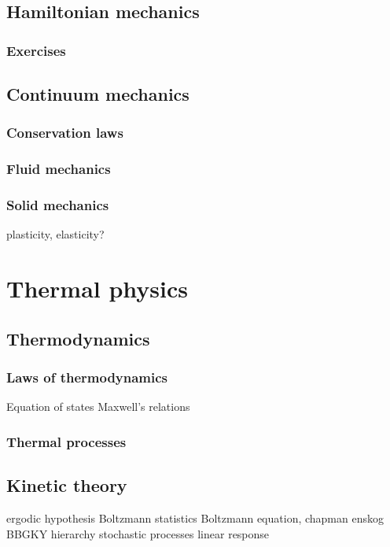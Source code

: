\documentclass{../../large}
\begin{document}
\chapter{Hamiltonian mechanics}

\section*{Exercises}



\chapter{Continuum mechanics}
\section{Conservation laws}
\section{Fluid mechanics}
\section{Solid mechanics}
plasticity, elasticity?







\part{Thermal physics}

\chapter{Thermodynamics}
\section{Laws of thermodynamics}
Equation of states
Maxwell's relations
\section{Thermal processes}

\chapter{Kinetic theory}
ergodic hypothesis
Boltzmann statistics
Boltzmann equation, chapman enskog
BBGKY hierarchy
stochastic processes
linear response
\end{document}
